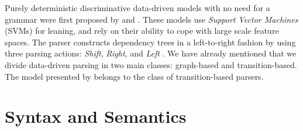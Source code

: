 Purely deterministic discriminative data-driven models with no need for a grammar were first proposed by  and . These models use \textit{Support Vector Machines} (SVMs) for leaning, and rely on their ability to cope with large scale feature spaces. The parser constructs dependency trees in a left-to-right fashion by using three parsing actions: \textit{Shift}, \textit{Right}, and \textit{Left} \cite{Yamada:03}. We have already mentioned that we divide data-driven parsing in two main classes: graph-based and transition-based. The model presented by  belongs to the class of transition-based parsers.




\section{Syntax and Semantics}
\label{syntactic-semantic}
